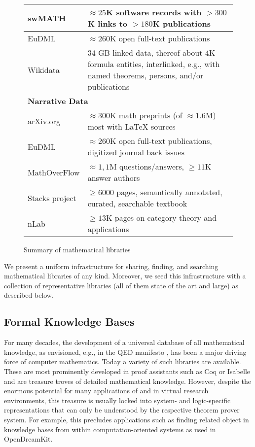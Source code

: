 \begin{figure*}[htp]
\begin{tabular}{| p{} | p{}|}
  swMATH \cite{swMATH:on} & $\approx 25$K software records with $> 300$K links to $> 180$K publications \\\hline
  EuDML  \cite{EuDML:on} & $\approx 260$K open full-text publications \\\hline
  Wikidata  \cite{wikidata:on} & $34$ GB linked data, thereof about $4$K formula entities, interlinked, e.g., with named theorems, persons, and/or publications \\\hline
  \multicolumn{2}{|l|}{\textbf{Narrative Data}} \\\hline
  arXiv.org & $\approx 300$K math preprints (of $\approx1.6$M) most with {\LaTeX} sources\\\hline
  EuDML  \cite{EuDML:on} & $\approx 260$K open full-text publications, digitized journal back issues \\\hline
  MathOverFlow & $\approx 1,1$M questions/answers, $\geq11$K answer authors \\\hline
  Stacks project & $\geq 6000$ pages, semantically annotated, curated, searchable textbook \\\hline
  nLab & $\geq 13$K pages on category theory and applications\\\hline
\end{tabular}
  \caption{Summary of mathematical libraries}\label{fig:datasets}
\end{figure*}


We present a uniform infrastructure for sharing, finding, and searching mathematical libraries of any kind.
Moreover, we seed this infrastructure with a collection of representative libraries (all of them state of the art and large) as described below.

\subsection{Formal Knowledge Bases}\label{sec:isabelle}
For many decades, the development of a universal database of all mathematical knowledge, as envisioned, e.g., in the QED manifesto \cite{qed}, has been a major driving force of computer mathematics.
Today a variety of such libraries are available.
These are most prominently developed in proof assistants such as Coq \cite{coq} or Isabelle \cite{isabelle} and are treasure troves of detailed mathematical knowledge.
However, despite the enormous potential for many applications of and in virtual research environments, this treasure is usually locked into system- and logic-specific representations that can only be understood by the respective theorem prover system.
For example, this precludes applications such as finding related object in knowledge bases from within computation-oriented systems as used in OpenDreamKit.

